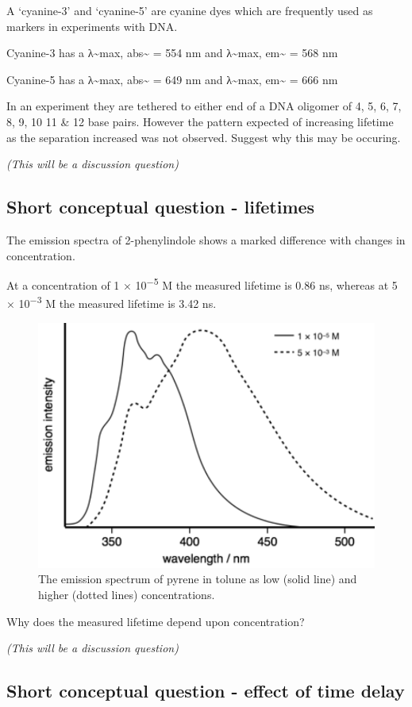 \documentclass[
]{book}
\begin{document}
A `cyanine-3' and `cyanine-5' are cyanine dyes which are frequently used as markers in experiments with DNA.

Cyanine-3 has a λ\textasciitilde max, abs\textasciitilde{} = 554 nm and λ\textasciitilde max, em\textasciitilde{} = 568 nm

Cyanine-5 has a λ\textasciitilde max, abs\textasciitilde{} = 649 nm and λ\textasciitilde max, em\textasciitilde{} = 666 nm

In an experiment they are tethered to either end of a DNA oligomer of 4, 5, 6, 7, 8, 9, 10 11 \& 12 base pairs. However the pattern expected of increasing lifetime as the separation increased was not observed. Suggest why this may be occuring.

\emph{(This will be a discussion question)}

\hypertarget{short-conceptual-question---lifetimes}{%
\subsection{Short conceptual question - lifetimes}\label{short-conceptual-question---lifetimes}}

The emission spectra of 2-phenylindole shows a marked difference with changes in concentration.

At a concentration of 1 × 10\textsuperscript{−5} M the measured lifetime is 0.86 ns, whereas at 5 × 10\textsuperscript{−3} M the measured lifetime is 3.42 ns.

\begin{figure}

{\centering \includegraphics[width=0.3\linewidth]{images/phenylindole} 

}

\caption{The emission spectrum of pyrene in tolune as low (solid line) and higher (dotted lines) concentrations.}\label{fig:phenylindole}
\end{figure}

Why does the measured lifetime depend upon concentration?

\emph{(This will be a discussion question)}

\hypertarget{short-conceptual-question---effect-of-time-delay}{%
\subsection{Short conceptual question - effect of time delay}\label{short-conceptual-question---effect-of-time-delay}}
\end{document}
